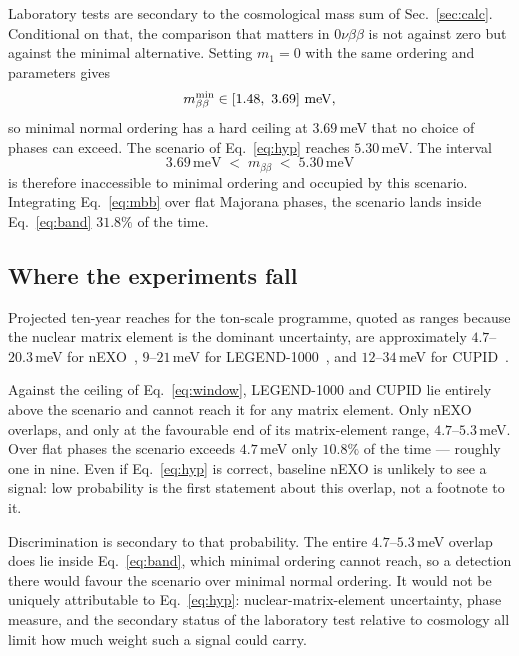 \documentclass[aps,prd,twocolumn,superscriptaddress,nofootinbib,10pt]{revtex4-2}
\begin{document}
Laboratory tests are secondary to the cosmological mass sum of Sec.~\ref{sec:calc}. Conditional on
that, the comparison that matters in $0\nu\beta\beta$ is not against zero but against the minimal
alternative. Setting $m_1 = 0$ with the same ordering and parameters gives
%
\begin{equation}
  m_{\beta\beta}^{\rm min} \in [1.48,\ 3.69]\ \mathrm{meV},
  \label{eq:minimal}
\end{equation}
%
so minimal normal ordering has a hard ceiling at $3.69\,$meV that no choice of phases can exceed.
The scenario of Eq.~\eqref{eq:hyp} reaches $5.30\,$meV. The interval
%
\begin{equation}
  3.69\,\mathrm{meV} \;<\; m_{\beta\beta} \;<\; 5.30\,\mathrm{meV}
  \label{eq:band}
\end{equation}
%
is therefore inaccessible to minimal ordering and occupied by this scenario. Integrating
Eq.~\eqref{eq:mbb} over flat Majorana phases, the scenario lands inside Eq.~\eqref{eq:band}
$31.8\%$ of the time.

\subsection{Where the experiments fall}

Projected ten-year reaches for the ton-scale programme, quoted as ranges because the nuclear matrix
element is the dominant uncertainty, are approximately $4.7$--$20.3\,$meV for
nEXO~\cite{nEXO2021}, $9$--$21\,$meV for LEGEND-1000~\cite{LEGEND1000}, and $12$--$34\,$meV for
CUPID~\cite{CUPID2019}.

Against the ceiling of Eq.~\eqref{eq:window}, LEGEND-1000 and CUPID lie entirely above the
scenario and cannot reach it for any matrix element. Only nEXO overlaps, and only at the favourable
end of its matrix-element range, $4.7$--$5.3\,$meV. Over flat phases the scenario exceeds
$4.7\,$meV only $10.8\%$ of the time --- roughly one in nine. Even if Eq.~\eqref{eq:hyp} is
correct, baseline nEXO is unlikely to see a signal: low probability is the first statement about
this overlap, not a footnote to it.

Discrimination is secondary to that probability. The entire $4.7$--$5.3\,$meV overlap does lie
inside Eq.~\eqref{eq:band}, which minimal ordering cannot reach, so a detection there would favour
the scenario over minimal normal ordering. It would not be uniquely attributable to
Eq.~\eqref{eq:hyp}: nuclear-matrix-element uncertainty, phase measure, and the secondary status of
the laboratory test relative to cosmology all limit how much weight such a signal could carry.
\end{document}
